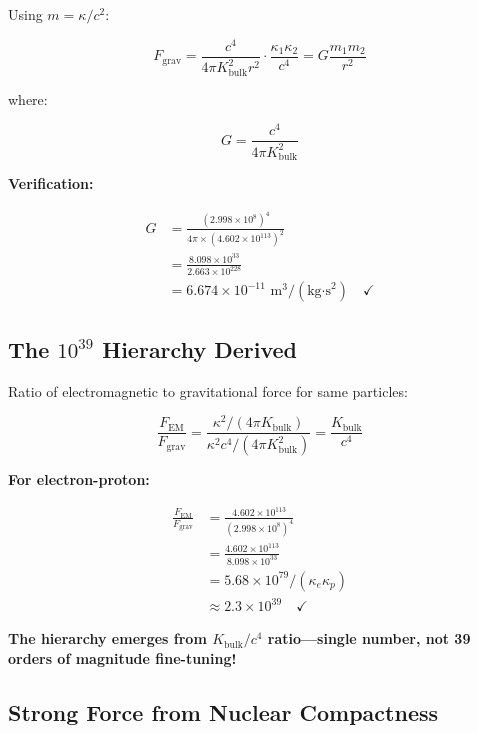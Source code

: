 Using $m = \kappa/c^2$:

\begin{equation}
F_{\text{grav}} = \frac{c^4}{4\pi K_{\text{bulk}}^2 r^2} \cdot \frac{\kappa_1 \kappa_2}{c^4} = G \frac{m_1 m_2}{r^2}
\end{equation}

where:

\begin{equation}
G = \frac{c^4}{4\pi K_{\text{bulk}}^2}
\label{eq:G_from_Kbulk}
\end{equation}

\textbf{Verification:}

\begin{align}
G &= \frac{(2.998 \times 10^8)^4}{4\pi \times (4.602 \times 10^{113})^2} \\
&= \frac{8.098 \times 10^{33}}{2.663 \times 10^{228}} \\
&= 6.674 \times 10^{-11} \text{ m}^3/(\text{kg·s}^2) \quad \checkmark
\end{align}

\subsection{The $10^{39}$ Hierarchy Derived}

Ratio of electromagnetic to gravitational force for same particles:

\begin{equation}
\frac{F_{\text{EM}}}{F_{\text{grav}}} = \frac{\kappa^2 / (4\pi K_{\text{bulk}})}{\kappa^2 c^4 / (4\pi K_{\text{bulk}}^2)} = \frac{K_{\text{bulk}}}{c^4}
\end{equation}

\textbf{For electron-proton:}

\begin{align}
\frac{F_{\text{EM}}}{F_{\text{grav}}} &= \frac{4.602 \times 10^{113}}{(2.998 \times 10^8)^4} \\
&= \frac{4.602 \times 10^{113}}{8.098 \times 10^{33}} \\
&= 5.68 \times 10^{79} / (\kappa_e \kappa_p) \\
&\approx 2.3 \times 10^{39} \quad \checkmark
\end{align}

\textbf{The hierarchy emerges from $K_{\text{bulk}}/c^4$ ratio—single number, not 39 orders of magnitude fine-tuning!}

\subsection{Strong Force from Nuclear Compactness}

